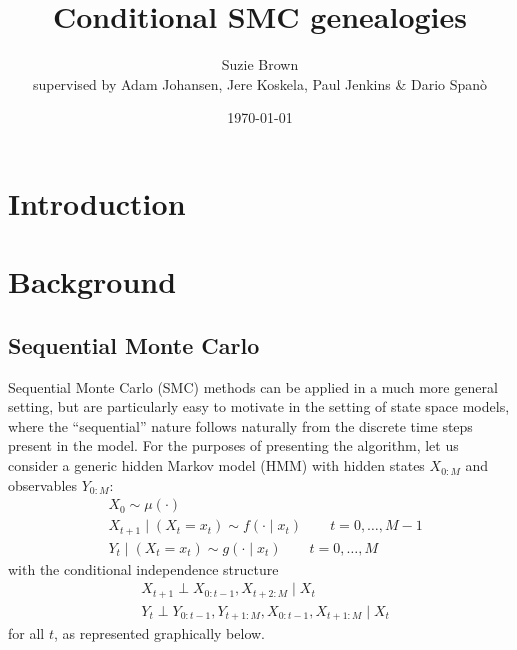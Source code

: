\documentclass{article}
\title{Conditional SMC genealogies}
\author{Suzie Brown\\ {\small supervised by Adam Johansen, Jere Koskela, Paul Jenkins \& Dario Span\`o}}
\date{\today}
\begin{document}
\maketitle

\section{Introduction}

\section{Background}

\subsection{Sequential Monte Carlo}
Sequential Monte Carlo (SMC) methods can be applied in a much more general setting, but are particularly easy to motivate in the setting of state space models, where the ``sequential'' nature follows naturally from the discrete time steps present in the model. 
For the purposes of presenting the algorithm, let us consider a generic hidden Markov model (HMM) with hidden states $X_{0:M}$ and observables $Y_{0:M}$:
\begin{align*}
& X_0 \sim \mu(\cdot) \\
& X_{t+1} \mid (X_t = x_t) \sim f(\cdot \mid x_t)  \qquad t=0,\dots,M-1 \\
& Y_t \mid (X_t = x_t) \sim g(\cdot \mid x_t) \qquad t=0,\dots,M
\end{align*}
with the conditional independence structure
\begin{align*}
& X_{t+1} \perp X_{0:t-1}, X_{t+2:M} \mid X_t \\
& Y_t \perp Y_{0:t-1}, Y_{t+1:M}, X_{0:t-1}, X_{t+1:M} \mid X_t
\end{align*}
for all $t$, as represented graphically below.

\begin{center}
\end{center}
\end{document}
